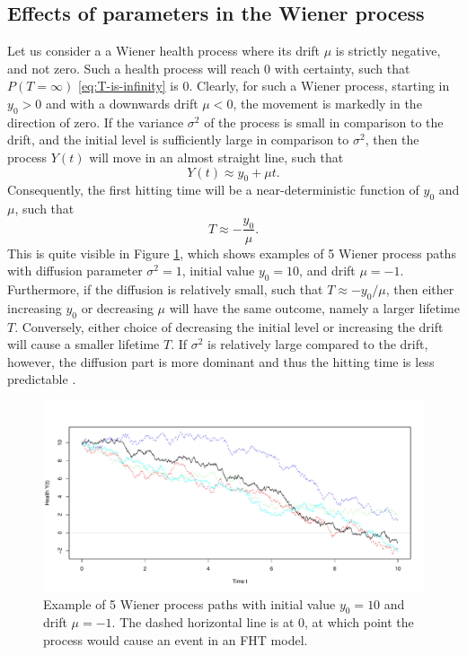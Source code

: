\subsection{Effects of parameters in the Wiener process}
Let us consider a a Wiener health process where its drift $\mu$ is strictly negative, and not zero.
Such a health process will reach 0 with certainty, such that $P(T=\infty)$ \eqref{eq:T-is-infinity} is 0.
Clearly, for such a Wiener process, starting in $y_0>0$ and with a downwards drift $\mu<0$, the movement is markedly in the direction of zero.
If the variance $\sigma^2$ of the process is small in comparison to the drift, and the initial level is sufficiently large in comparison to $\sigma^2$, then the process $Y(t)$ will move in an almost straight line, such that
\begin{equation*}
    Y(t)\approx y_0+\mu t.
\end{equation*}
Consequently, the first hitting time will be a near-deterministic function of $y_0$ and $\mu$, such that
\begin{equation*}
    T\approx -\frac{y_0}{\mu}.
\end{equation*}
This is quite visible in Figure \ref{plot:wiener}, which shows examples of 5 Wiener process paths with diffusion parameter $\sigma^2=1$, initial value $y_0=10$, and drift $\mu=-1$.
Furthermore, if the diffusion is relatively small, such that $T\approx -y_0/\mu$, then either increasing $y_0$ or decreasing $\mu$ will have the same outcome, namely a larger lifetime $T$.
Conversely, either choice of decreasing the initial level or increasing the drift will cause a smaller lifetime $T$.
If $\sigma^2$ is relatively large compared to the drift, however, the diffusion part is more dominant and thus the hitting time is less predictable \citep{ABG}.

\begin{figure}
\label{plot:wiener}
\caption{Example of 5 Wiener process paths with initial value $y_0=10$ and drift $\mu=-1$. The dashed horizontal line is at 0, at which point the process would cause an event in an FHT model.}
\centering
\includegraphics[scale=0.4]{figures/wiener_processes.pdf}
\end{figure}

